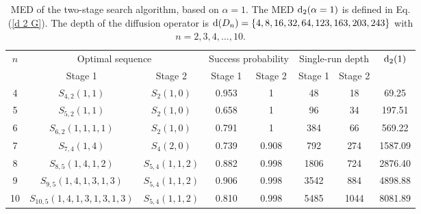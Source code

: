 \documentclass[%
 twocolumn,
 10pt,
 superscriptaddress,
 longbibliography,
 amsmath,amssymb,
 aps,
 pra,
floatfix,
]{revtex4-1}
\begin{document}
\begin{table}[h]
	\begin{ruledtabular}
		\caption{\label{Table 3} MED of the two-stage search algorithm, based on $\alpha=1$. The MED $\text d_2(\alpha=1)$ is defined in Eq. (\ref{d 2 G}). The depth of the diffusion operator is $\text d(D_n)=\{4,8,16,32,64,123,163,203,243\}$ with $n=2,3,4,\ldots,10$.}
		\begin{tabular}{cccccccc}

			$n$ & \multicolumn{2}{c}{Optimal sequence} & \multicolumn{2}{c}{Success probability} & \multicolumn{2}{c}{Single-run depth} & $\text d_2(1)$                               \\

			    & Stage 1                              & Stage 2                                 & Stage 1                              & Stage 2        & Stage 1 & Stage 2 &         \\ \hline

			4   & $S_{4,2}(1,1)$                       & $S_{2}(1,0)$                            & 0.953                                & 1              & 48      & 18      & 69.25   \\

			5   & $S_{5,2}(1,1)$                       & $S_{2}(1,0)$                            & 0.658                                & 1              & 96      & 34      & 197.51  \\

			6   & $S_{6,2}(1,1,1,1)$                   & $S_{2}(1,0)$                            & 0.791                                & 1              & 384     & 66      & 569.22  \\

			7   & $S_{7,4}(1,4)$                       & $S_{4}(2,0)$                            & 0.739                                & 0.908          & 792     & 274     & 1587.09 \\

			8   & $S_{8,5}(1,4,1,2)$                   & $S_{5,4}(1,1,2)$                        & 0.882                                & 0.998          & 1806    & 724     & 2876.40 \\

			9   & $S_{9,5}(1,4,1,3,1,3)$               & $S_{5,4}(1,1,2)$                        & 0.906                                & 0.998          & 3542    & 884     & 4898.88 \\

			10  & $S_{10,5}(1,4,1,3,1,3,1,3)$          & $S_{5,4}(1,1,2)$                        & 0.810                                & 0.998          & 5485    & 1044    & 8081.89 \\
		\end{tabular}
	\end{ruledtabular}
\end{table}
\end{document}
